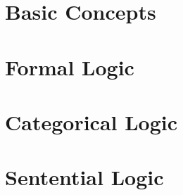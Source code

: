 \documentclass[nobib]{tufte-book}
\begin{document}

\raggedright
\setlength{\parindent}{1em}
\setlength{\parskip}{1em}

\frontmatter
\pagestyle{plain} %




{
\setlength{\parskip}{0em}

\renewcommand{\cftpartpresnum}{\sf\Large\partname\ }
\tableofcontents
}






\mainmatter
\setlength{\parindent}{1em}
\pagestyle{headings} %
\label{full_version} %

\listoffigures %

\newpage
\listoftables %

%
\part{Basic Concepts} \label{part:basic_concepts}



\part{Formal Logic}\label{part:formal_logic}


\part{Categorical Logic}\label{part:cat_logic}


\part{Sentential Logic} \label{part:sent_logic}




\end{document}
